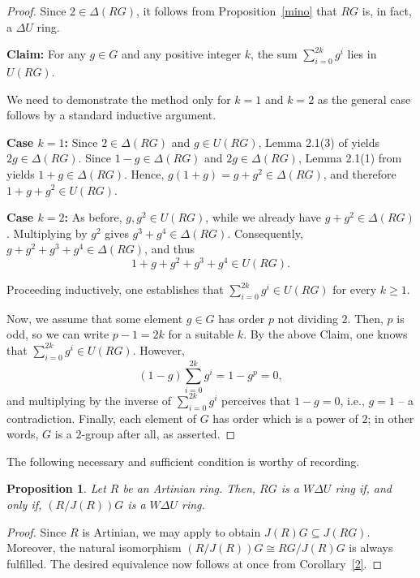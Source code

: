 \documentclass[12pt]{amsart}
\newtheorem{proposition}[theorem]{Proposition}
\theoremstyle{definition}
\begin{document}
\begin{proof}
Since \(2 \in \Delta(RG)\), it follows from Proposition~\ref{mino} that \(RG\) is, in fact, a \(\Delta U\) ring.

\medskip

\textbf{Claim:} For any \(g \in G\) and any positive integer \(k\), the sum \(\sum_{i=0}^{2k} g^i\) lies in \(U(RG)\).

\medskip

We need to demonstrate the method only for \(k = 1\) and \(k = 2\) as the general case follows by a standard inductive argument.
	
\medskip

\textbf{Case \(k = 1\):} Since \(2 \in \Delta(RG)\) and \(g \in U(RG)\), Lemma 2.1(3) of \cite{7} yields \(2g \in \Delta(RG)\). Since \(1 - g \in \Delta(RG)\) and \(2g \in \Delta(RG)\), Lemma 2.1(1) from \cite{7} yields \(1 + g \in \Delta(RG)\). Hence, \(g(1+g) = g + g^2 \in \Delta(RG)\), and therefore \(1 + g + g^2 \in U(RG)\).

\medskip
		
\textbf{Case \(k = 2\):} As before, \(g, g^2 \in U(RG)\), while we already have \(g + g^2 \in \Delta(RG)\).
Multiplying by \(g^2\) gives \(g^3 + g^4 \in \Delta(RG)\). Consequently, \(g + g^2 + g^3 + g^4 \in \Delta(RG)\), and thus
\[
1 + g + g^2 + g^3 + g^4 \in U(RG).
\]
	
Proceeding inductively, one establishes that \(\sum_{i=0}^{2k} g^i \in U(RG)\) for every \(k \ge 1\).

Now, we assume that some element \(g \in G\) has order \(p\) not dividing \(2\). Then, \(p\) is odd, so we can write \(p-1 = 2k\) for a suitable \(k\). By the above Claim, one knows that \(\sum_{i=0}^{2k} g^i \in U(RG)\). However,
\[
(1 - g) \sum_{i=0}^{2k} g^i = 1 - g^{p} = 0,
\]
and multiplying by the inverse of \(\sum_{i=0}^{2k} g^i\) perceives that \(1 - g = 0\), i.e., \(g = 1\) -- a contradiction. Finally, each element of \(G\) has order which is a power of \(2\); in other words, \(G\) is a \(2\)-group after all, as asserted.
\end{proof}

The following necessary and sufficient condition is worthy of recording.

\begin{proposition}
Let \(R\) be an Artinian ring. Then, \(RG\) is a \(W\Delta U\) ring if, and only if, \((R/J(R))G\) is a \(W\Delta U\) ring.
\end{proposition}

\begin{proof}
Since \(R\) is Artinian, we may apply \cite[Proposition 3]{con} to obtain \(J(R)G \subseteq J(RG)\). Moreover, the natural isomorphism \((R/J(R))G \cong RG/J(R)G\) is always fulfilled. The desired equivalence now follows at once from Corollary~\ref{2}.
\end{proof}
\end{document}
